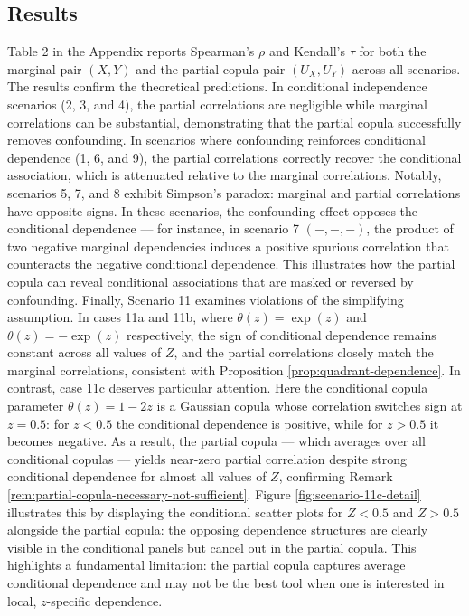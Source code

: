\documentclass[
]{article}
\begin{document}
\normalsize

\subsection{Results}\label{results}

Table 2 in the Appendix reports Spearman's \(\rho\) and Kendall's
\(\tau\) for both the marginal pair \((X,Y)\) and the partial copula
pair \((U_X, U_Y)\) across all scenarios. The results confirm the
theoretical predictions. In conditional independence scenarios (2, 3,
and 4), the partial correlations are negligible while marginal
correlations can be substantial, demonstrating that the partial copula
successfully removes confounding. In scenarios where confounding
reinforces conditional dependence (1, 6, and 9), the partial
correlations correctly recover the conditional association, which is
attenuated relative to the marginal correlations. Notably, scenarios 5,
7, and 8 exhibit Simpson's paradox: marginal and partial correlations
have opposite signs. In these scenarios, the confounding effect opposes
the conditional dependence --- for instance, in scenario 7 \((-,-,-)\),
the product of two negative marginal dependencies induces a positive
spurious correlation that counteracts the negative conditional
dependence. This illustrates how the partial copula can reveal
conditional associations that are masked or reversed by confounding.
Finally, Scenario 11 examines violations of the simplifying assumption.
In cases 11a and 11b, where \(\theta(z) = \exp(z)\) and
\(\theta(z) = -\exp(z)\) respectively, the sign of conditional
dependence remains constant across all values of \(Z\), and the partial
correlations closely match the marginal correlations, consistent with
Proposition \ref{prop:quadrant-dependence}. In contrast, case 11c
deserves particular attention. Here the conditional copula parameter
\(\theta(z) = 1 - 2z\) is a Gaussian copula whose correlation switches
sign at \(z = 0.5\): for \(z < 0.5\) the conditional dependence is
positive, while for \(z > 0.5\) it becomes negative. As a result, the
partial copula --- which averages over all conditional copulas ---
yields near-zero partial correlation despite strong conditional
dependence for almost all values of \(Z\), confirming Remark
\ref{rem:partial-copula-necessary-not-sufficient}. Figure
\ref{fig:scenario-11c-detail} illustrates this by displaying the
conditional scatter plots for \(Z < 0.5\) and \(Z > 0.5\) alongside the
partial copula: the opposing dependence structures are clearly visible
in the conditional panels but cancel out in the partial copula. This
highlights a fundamental limitation: the partial copula captures average
conditional dependence and may not be the best tool when one is
interested in local, \(z\)-specific dependence.
\end{document}
